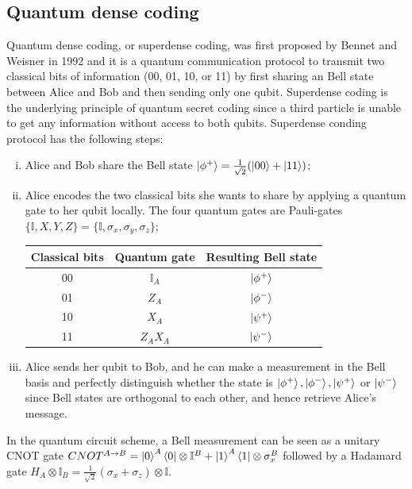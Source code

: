 \documentclass[10pt,a4paper]{book}
\numberwithin{equation}{chapter}
\numberwithin{figure}{chapter}
\numberwithin{table}{chapter}
\begin{document}
\subsection{Quantum dense coding}
Quantum dense coding, or superdense coding, was first proposed by Bennet and Weisner in 1992 \cite{densecoding} and it is a quantum communication protocol to transmit two classical bits of information (00, 01, 10, or 11) by first sharing an Bell state between Alice and Bob and then sending only one qubit. Superdense coding is the underlying principle of quantum secret coding since a third particle is unable to get any information without access to both qubits. Superdense conding protocol has the following steps:
\begin{enumerate}[(i)]
\item Alice and Bob share the Bell state $\ket{\phi^{+}}=\frac{1}{\sqrt{2}}(\ket{00}+\ket{11})$;
\item Alice encodes the two classical bits she wants to share by applying a quantum gate to her qubit locally. The four quantum gates are Pauli-gates $\lbrace \mathbb{I},X,Y,Z \rbrace = \lbrace \mathbb{I},\sigma_x ,\sigma_y ,\sigma_z \rbrace $;
\begin{table}[H]
    \centering
    \begin{tabular}{|c|c|c|}
    \hline
   Classical bits & Quantum gate & Resulting Bell state  \\
    \hline
 00 & $\mathbb{I}_{A}$&$\ket{\phi^{+}}$\\
 01& $Z_{A}$&$\ket{\phi^{-}}$\\
 10& $X_{A}$&$\ket{\psi^{+}}$\\
  11& $Z_{A}X_A$&$\ket{\psi^{-}}$\\
   \hline
    \end{tabular}
\end{table}
\item Alice sends her qubit to Bob, and he can make a measurement in the Bell basis and perfectly distinguish whether the state is $\ket{\phi^{+}},\ket{\phi^{-}},\ket{\psi^{+}}$ or $\ket{\psi^{-}}$ since Bell states are orthogonal to each other, and hence retrieve Alice's message. 
\end{enumerate}
In the quantum circuit scheme, a Bell measurement can be seen as a unitary CNOT gate $CNOT^{A \rightarrow B}=\ket{0}^{A}\bra{0}\otimes \mathbb{I}^B + \ket{1}^{A}\bra{1} \otimes \sigma^{B}_x$ followed by a Hadamard gate $H_A \otimes \mathbb{I}_B=\frac{1}{\sqrt{2}}(\sigma_x + \sigma_z)\otimes \mathbb{I}$.
\end{document}
